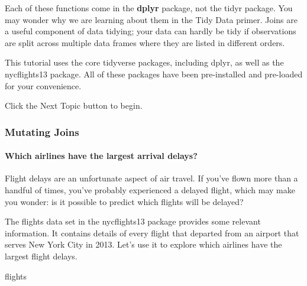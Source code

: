 \documentclass[
]{article}
\newenvironment{Shaded}{\begin{snugshade}}{\end{snugshade}}
\newcommand{\NormalTok}[1]{#1}
\begin{document}
Each of these functions come in the \textbf{dplyr} package, not the
tidyr package. You may wonder why we are learning about them in the Tidy
Data primer. Joins are a useful component of data tidying; your data can
hardly be tidy if observations are split across multiple data frames
where they are listed in different orders.

This tutorial uses the core tidyverse packages, including dplyr, as well
as the nycflights13 package. All of these packages have been
pre-installed and pre-loaded for your convenience.

Click the Next Topic button to begin.

\hypertarget{mutating-joins}{%
\subsubsection{Mutating Joins}\label{mutating-joins}}

\hypertarget{which-airlines-have-the-largest-arrival-delays}{%
\paragraph{Which airlines have the largest arrival
delays?}\label{which-airlines-have-the-largest-arrival-delays}}

Flight delays are an unfortunate aspect of air travel. If you've flown
more than a handful of times, you've probably experienced a delayed
flight, which may make you wonder: is it possible to predict which
flights will be delayed?

The flights data set in the nycflights13 package provides some relevant
information. It contains details of every flight that departed from an
airport that serves New York City in 2013. Let's use it to explore which
airlines have the largest flight delays.

\begin{Shaded}
\begin{Highlighting}[]
\NormalTok{flights}
\end{Highlighting}
\end{Shaded}
\end{document}
